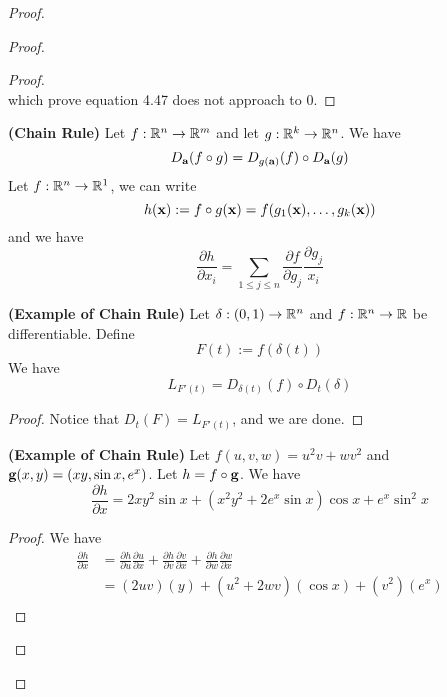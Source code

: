 \documentclass{report}
\begin{document}
\begin{proof}
\begin{proof}
\begin{proof}
\begin{equation}
\end{equation}
which prove  equation 4.47 does not approach to 0.
\end{proof}
\begin{theorem}
\label{5.3.4}
\textbf{(Chain Rule)} Let $f:\mathbb{R}^n\rightarrow \mathbb{R}^m$ and let $g:\mathbb{R}^k\rightarrow \mathbb{R}^n$. We have
\begin{equation}
D_{\textbf{a}}(f\circ g)=D_{g(\textbf{a})}(f)\circ D_{\textbf{a}}(g)
\end{equation}
Let $f:\mathbb{R}^n\rightarrow \mathbb{R}^1$, we can write 
\begin{equation}
h(\textbf{x}):=f\circ g(\textbf{x})=f(g_1(\textbf{x}),\dots, g_k(\textbf{x}))
\end{equation}
and we have
\begin{equation}
\frac{\partial h}{\partial x_i}=\sum_{1\leq j\leq n}\frac{\partial f}{\partial g_j}\frac{\partial g_j}{x_i}
\end{equation}
\end{theorem}
\begin{theorem}
\label{5.3.5}
\textbf{(Example of Chain Rule)} Let $\delta:(0,1)\rightarrow \mathbb{R}^n$ and $f:\mathbb{R}^n\rightarrow \mathbb{R}$ be differentiable. Define
\begin{equation}
F(t):=f(\delta (t))
\end{equation}
We have
\begin{equation}
L_{F'(t)}=D_{\delta (t)}(f)\circ D_{t}(\delta)
\end{equation}
\end{theorem}
\begin{proof}
Notice that $D_t(F)=L_{F'(t)}$, and we are done.
\end{proof}
\begin{theorem}
\label{5.3.6}
\textbf{(Example of Chain Rule)} Let $f(u,v,w)=u^2v+wv^2$ and $\textbf{g}(x,y)=(xy,\sin x,e^x)$. Let $h=f\circ \textbf{g}$. We have
\begin{equation}
\frac{\partial h}{\partial x}=2xy^2\sin x+(x^2y^2+2e^x\sin x) \cos x+ e^x\sin^2 x
\end{equation}
\end{theorem}
\begin{proof}
We have
\begin{align}
  \frac{\partial h}{\partial x}&=\frac{\partial h}{\partial u}\frac{\partial u}{\partial x}+\frac{\partial h}{\partial v}\frac{\partial v}{\partial x}+\frac{\partial h}{\partial w}\frac{\partial w}{\partial x}\\
  &=(2uv)(y)+(u^2+2wv)(\cos x)+(v^2)(e^x)\\

\end{align}
\end{proof}
\end{proof}
\end{proof}
\end{document}

